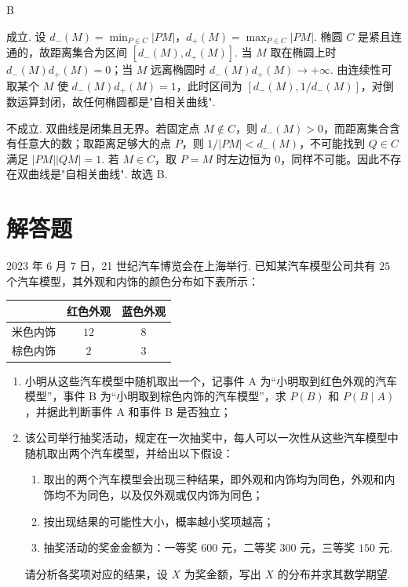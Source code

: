 \begin{answer}
B
\end{answer}

\begin{solution}
 成立. 设 \(d_-(M)=\min_{P\in C}|PM|\)，\(d_+(M)=\max_{P\in C}|PM|\). 椭圆 \(C\) 是紧且连通的，故距离集合为区间 \([d_-(M),d_+(M)]\). 当 \(M\) 取在椭圆上时 \(d_-(M)d_+(M)=0\)；当 \(M\) 远离椭圆时 \(d_-(M)d_+(M)\to+\infty\). 由连续性可取某个 \(M\) 使 \(d_-(M)d_+(M)=1\)，此时区间为 \([d_-(M),1/d_-(M)]\)，对倒数运算封闭，故任何椭圆都是"自相关曲线".

 不成立. 双曲线是闭集且无界。若固定点 \(M\notin C\)，则 \(d_-(M)>0\)，而距离集合含有任意大的数；取距离足够大的点 \(P\)，则 \(1/|PM|<d_-(M)\)，不可能找到 \(Q\in C\) 满足 \(|PM||QM|=1\). 若 \(M\in C\)，取 \(P=M\) 时左边恒为 \(0\)，同样不可能。因此不存在双曲线是"自相关曲线". 故选 B.
\end{solution}

\section{解答题}

\begin{problem}
2023 年 6 月 7 日，21 世纪汽车博览会在上海举行. 已知某汽车模型公司共有 \(25\) 个汽车模型，其外观和内饰的颜色分布如下表所示：

\begin{center}
\begin{tabular}{c|cc}
\hline
& 红色外观 & 蓝色外观\\
\hline
米色内饰 & \(12\) & \(8\)\\
棕色内饰 & \(2\) & \(3\)\\
\hline
\end{tabular}
\end{center}

\begin{enumerate}
\item 小明从这些汽车模型中随机取出一个，记事件 A 为“小明取到红色外观的汽车模型”，事件 B 为“小明取到棕色内饰的汽车模型”，求 \(P(B)\) 和 \(P(B\mid A)\)，并据此判断事件 A 和事件 B 是否独立；
\item 该公司举行抽奖活动，规定在一次抽奖中，每人可以一次性从这些汽车模型中随机取出两个汽车模型，并给出以下假设：
\begin{enumerate}
\item 取出的两个汽车模型会出现三种结果，即外观和内饰均为同色，外观和内饰均不为同色，以及仅外观或仅内饰为同色；
\item 按出现结果的可能性大小，概率越小奖项越高；
\item 抽奖活动的奖金金额为：一等奖 \(600\) 元，二等奖 \(300\) 元，三等奖 \(150\) 元.
\end{enumerate}
请分析各奖项对应的结果，设 \(X\) 为奖金额，写出 \(X\) 的分布并求其数学期望.
\end{enumerate}
\end{problem}

